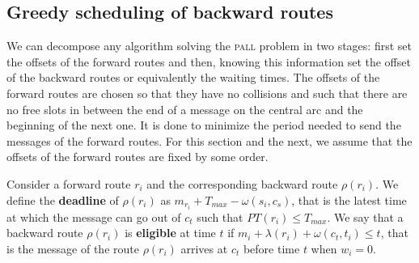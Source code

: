 \documentclass[10pt, conference, letterpaper]{IEEEtran}
\newcommand\pall{\textsc{pall}\xspace}
\begin{document}
     
%	 
% 
%    
   \subsection{Greedy scheduling of backward routes}
    
    We can decompose any algorithm solving the \pall problem in two stages: first set the offsets of the forward routes and then, knowing this information set the offset of the backward routes or equivalently the waiting times.  
    The offsets of the forward routes are chosen so that they have no collisions and such that there are no free slots in between the end of a message on the central arc and the beginning of the next one. 
    It is done to minimize the period needed to send the messages of the forward routes. For this section and the next, we assume that the offsets of the forward routes are fixed by some order. 
    
    Consider a forward route $r_i$ and the corresponding backward route $\rho(r_i)$.
    We define the {\bf deadline} of $\rho(r_i)$ as $m_{r_i} + T_{max} - \omega(s_i,c_s)$, that is the latest time at which the message can go out of $c_t$ such that $PT(r_i) \leq T_{max}$.
    We say that a backward route $\rho(r_i)$ is {\bf eligible} at time $t$ if $m_{i} +  \lambda(r_i) + \omega(c_t,t_i) \leq t$, that is the message of the route $\rho(r_i)$ arrives at $c_t$ before time $t$ when $w_i = 0$.
    
\end{document}
